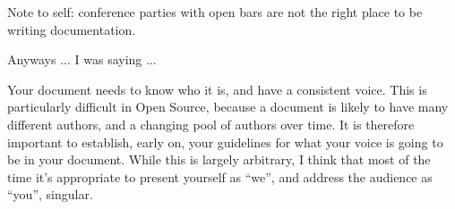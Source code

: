 Note to self: conference parties with open bars are not the right place
to be writing documentation.

Anyways ... I was saying ...

Your document needs to know who it is, and have a consistent voice. This
is particularly difficult in Open Source, because a document is likely
to have many different authors, and a changing pool of authors over
time. It is therefore important to establish, early on, your guidelines
for what your voice is going to be in your document. While this is
largely arbitrary, I think that most of the time it's appropriate to
present yourself as ``we'', and address the audience as ``you'',
singular.


